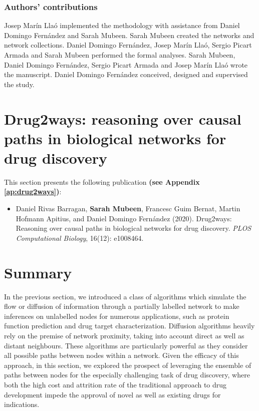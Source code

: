 \subsubsection{Authors' contributions}

Josep Marín Llaó implemented the methodology with assistance from Daniel Domingo Fernández and Sarah Mubeen. Sarah Mubeen created the networks and network collections. Daniel Domingo Fernández, Josep Marín Llaó, Sergio Picart Armada and Sarah Mubeen performed the formal analyses. Sarah Mubeen, Daniel Domingo Fernández, Sergio Picart Armada and Josep Marín Llaó wrote the manuscript. Daniel Domingo Fernández conceived, designed and supervised the study. 


\section{Drug2ways: reasoning over causal paths in biological networks for drug discovery}

\label{ch:drug2ways}

This section presents the following publication \textbf{(see Appendix \ref{ap:drug2ways})}:

\begin{itemize}

\item[] Daniel Rivas Barragan, \textbf{Sarah Mubeen}, Francesc Guim Bernat, Martin Hofmann Apitius, and Daniel Domingo Fernández (2020). Drug2ways: Reasoning over causal paths in biological networks for drug discovery. \textit{PLOS Computational Biology}, 16(12): e1008464.

\end{itemize}

\section*{Summary}

In the previous section, we introduced a class of algorithms which simulate the flow or diffusion of information through a partially labelled network to make inferences on unlabelled nodes for numerous applications, such as protein function prediction and drug target characterization. Diffusion algorithms heavily rely on the premise of network proximity, taking into account direct as well as distant neighbours. These algorithms are particularly powerful as they consider all possible paths between nodes within a network. Given the efficacy of this approach, in this section, we explored the prospect of leveraging the ensemble of paths between nodes for the especially challenging task of drug discovery, where both the high cost and attrition rate of the traditional approach to drug development impede the approval of novel as well as existing drugs for indications.

